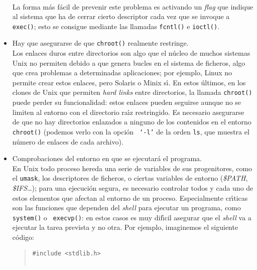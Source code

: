 \begin{itemize}
\\La forma m\'as f\'acil de prevenir este problema es activando un {\it flag}
que indique al sistema que ha de cerrar cierto descriptor cada vez que se 
invoque a {\tt exec()}; esto se consigue mediante las llamadas {\tt fcntl()}
e {\tt ioctl()}.
\item Hay que asegurarse de que {\tt chroot()} realmente restringe.\\
Los enlaces duros entre directorios son algo que el n\'ucleo de muchos sistemas
Unix no permiten debido a que genera bucles en el sistema de ficheros, algo
que crea problemas a determinadas aplicaciones; por ejemplo, Linux no permite
crear estos enlaces, pero Solaris o Minix s\'{\i}. En estos \'ultimos, en los
clones de Unix que permiten {\it hard links} entre directorios, la llamada
{\tt chroot()} puede perder su funcionalidad: estos enlaces pueden seguirse
aunque no se limiten al entorno con el directorio ra\'{\i}z restringido. Es
necesario asegurarse de que no hay directorios enlazados a ninguno de los 
contenidos en el entorno {\tt chroot()} (podemos verlo con la opci\'on {\tt 
`-l'} de la orden {\tt ls}, que muestra el n\'umero de enlaces de cada 
archivo).
\item Comprobaciones del entorno en que se ejecutar\'a el programa.\\
En Unix todo proceso hereda una serie de variables de sus 
progenitores, como el {\tt umask}, los descriptores de ficheros, o ciertas 
variables de entorno ({\it \$PATH}, {\it \$IFS}\ldots); para una ejecuci\'on 
segura, es necesario controlar todos y cada uno de estos elementos que afectan 
al entorno de un proceso. Especialmente cr\'{\i}ticas son las funciones que
dependen del {\it shell} para ejecutar un programa, como {\tt system()} o {\tt
execvp()}: en estos casos es muy dif\'{\i}cil asegurar que el {\it shell} va
a ejecutar la tarea prevista y no otra. Por ejemplo, imaginemos el siguiente
c\'odigo:
\begin{quote}
\begin{verbatim}
#include <stdlib.h>


\end{verbatim}
\end{quote}
\end{itemize}
